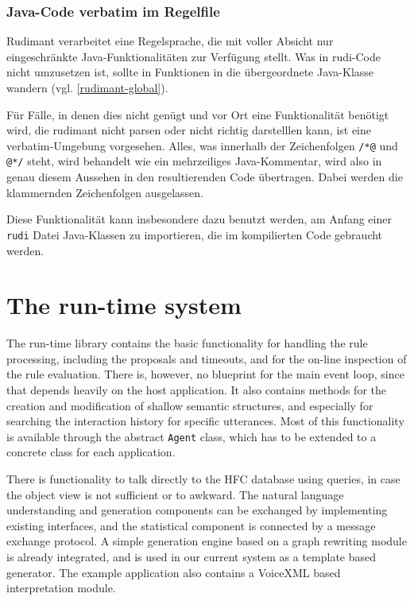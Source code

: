 \subsubsection{Java-Code verbatim im Regelfile} \label{sec:rudi-verbatim}

Rudimant verarbeitet eine Regelsprache, die mit voller Absicht nur
eingeschränkte Java-Funktionalitäten zur Verfügung stellt. Was in rudi-Code
nicht umzusetzen ist, sollte in Funktionen in die übergeordnete Java-Klasse
wandern (vgl. \ref{rudimant-global}).

Für Fälle, in denen dies nicht genügt und vor Ort eine Funktionalität benötigt
wird, die rudimant nicht parsen oder nicht richtig darstelllen kann, ist eine
verbatim-Umgebung vorgesehen. Alles, was innerhalb der Zeichenfolgen \verb|/*@|
und \verb|@*/| steht, wird behandelt wie ein mehrzeiliges Java-Kommentar, wird
also in genau diesem Aussehen in den resultierenden Code übertragen. Dabei
werden die klammernden Zeichenfolgen ausgelassen.

Diese Funktionalität kann insbesondere dazu benutzt werden, am Anfang einer
\texttt{rudi} Datei Java-Klassen zu importieren, die im kompilierten Code
gebraucht werden.

\section{The run-time system}

The run-time library contains the basic functionality for handling the rule
processing, including the proposals and timeouts, and for the on-line
inspection of the rule evaluation. There is, however, no blueprint for the main
event loop, since that depends heavily on the host application. It also
contains methods for the creation and modification of shallow semantic
structures, and especially for searching the interaction history for specific
utterances. Most of this functionality is available through the abstract
\texttt{Agent} class, which has to be extended to a concrete class for each
application.

There is functionality to talk directly to the HFC database using queries, in
case the object view is not sufficient or to awkward. The natural language
understanding and generation components can be exchanged by implementing existing
interfaces, and the statistical component is connected by a message exchange
protocol. A simple generation engine based on a graph rewriting module is
already integrated, and is used in our current system as a template based
generator. The example application also contains a VoiceXML based
interpretation module.

